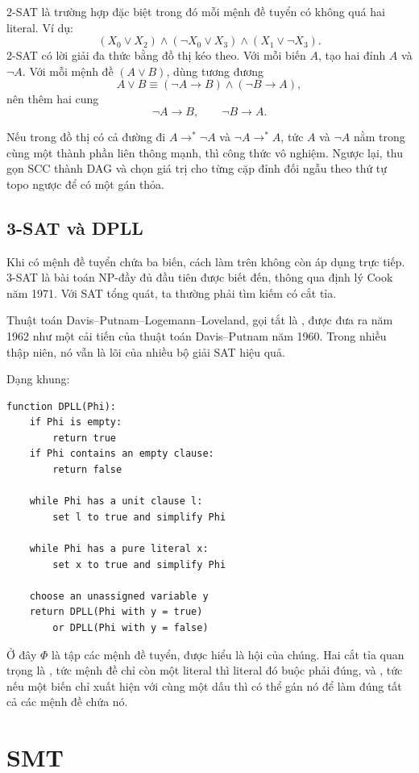 \documentclass[11pt]{article}
\begin{document}
2-SAT là trường hợp đặc biệt trong đó mỗi mệnh đề tuyển có không quá hai
literal. Ví dụ:
\[
  (X_0\lor X_2)\land(\neg X_0\lor X_3)\land(X_1\lor\neg X_3).
\]
2-SAT có lời giải đa thức bằng đồ thị kéo theo. Với mỗi biến \(A\), tạo hai
đỉnh \(A\) và \(\neg A\). Với mỗi mệnh đề \((A\lor B)\), dùng tương đương
\[
  A\lor B \equiv (\neg A\to B)\land(\neg B\to A),
\]
nên thêm hai cung
\[
  \neg A\to B,\qquad \neg B\to A.
\]

Nếu trong đồ thị có cả đường đi \(A\to^{*}\neg A\) và
\(\neg A\to^{*}A\), tức \(A\) và \(\neg A\) nằm trong cùng một thành phần
liên thông mạnh, thì công thức vô nghiệm. Ngược lại, thu gọn SCC thành DAG và
chọn giá trị cho từng cặp đỉnh đối ngẫu theo thứ tự topo ngược để có một gán
thỏa.

\subsection{3-SAT và DPLL}

Khi có mệnh đề tuyển chứa ba biến, cách làm trên không còn áp dụng trực tiếp.
3-SAT là bài toán NP-đầy đủ đầu tiên được biết đến, thông qua định lý Cook
năm 1971. Với SAT tổng quát, ta thường phải tìm kiếm có cắt tỉa.

Thuật toán Davis--Putnam--Logemann--Loveland, gọi tắt là , được
đưa ra năm 1962 như một cải tiến của thuật toán Davis--Putnam năm 1960. Trong
nhiều thập niên, nó vẫn là lõi của nhiều bộ giải SAT hiệu quả.

Dạng khung:
\begin{verbatim}
function DPLL(Phi):
    if Phi is empty:
        return true
    if Phi contains an empty clause:
        return false

    while Phi has a unit clause l:
        set l to true and simplify Phi

    while Phi has a pure literal x:
        set x to true and simplify Phi

    choose an unassigned variable y
    return DPLL(Phi with y = true)
        or DPLL(Phi with y = false)
\end{verbatim}

Ở đây \(\Phi\) là tập các mệnh đề tuyển, được hiểu là hội của chúng. Hai cắt
tỉa quan trọng là , tức mệnh đề chỉ còn một literal
thì literal đó buộc phải đúng, và , tức nếu một
biến chỉ xuất hiện với cùng một dấu thì có thể gán nó để làm đúng tất cả các
mệnh đề chứa nó.

\section{SMT}
\end{document}
